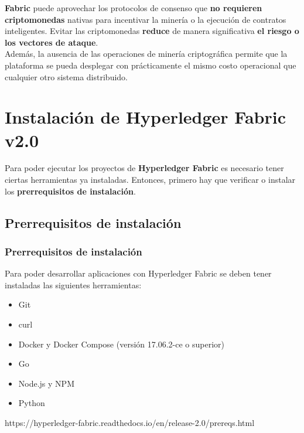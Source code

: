 \documentclass{beamer}
\begin{document}
	\begin{frame}
		\textbf{Fabric} puede aprovechar los protocolos de consenso que \textbf{no requieren criptomonedas} nativas para incentivar la minería o la ejecución de contratos inteligentes. Evitar las criptomonedas \textbf{reduce} de manera significativa \textbf{el riesgo o los vectores de ataque}.\\
		\vspace{4mm}
		Además, la ausencia de las operaciones de minería criptográfica permite que la plataforma se pueda desplegar con prácticamente el mismo costo operacional que cualquier otro sistema distribuido. 
	\end{frame}
	
	\section{Instalación de Hyperledger Fabric v2.0}
	
	\begin{frame}
		Para poder ejecutar los proyectos de \textbf{Hyperledger Fabric} es necesario tener ciertas herramientas ya instaladas. Entonces, primero hay que verificar o instalar los \textbf{prerrequisitos de instalación}.
	\end{frame}
	
	\subsection{Prerrequisitos de instalación}
	
	\begin{frame}
		\frametitle{Prerrequisitos de instalación}
		Para poder desarrollar aplicaciones con Hyperledger Fabric se deben tener instaladas las siguientes herramientas:
		\begin{itemize}
			\item Git
			\item curl
			\item Docker y Docker Compose (versión 17.06.2-ce o superior)
			\item Go
			\item Node.js y NPM
			\item Python
		\end{itemize}
		\begin{center}
			\tiny{https://hyperledger-fabric.readthedocs.io/en/release-2.0/prereqs.html}
		\end{center}
	\end{frame}
	
\end{document}
